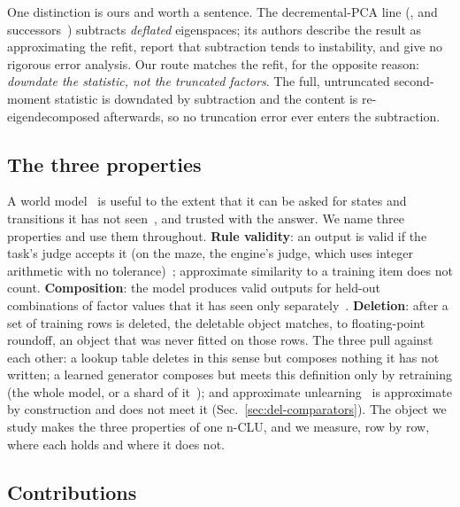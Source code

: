 \documentclass{article} %
\begin{document}
One distinction is ours and worth a sentence. The decremental-PCA line
(\citealp{hall_adding_2002}, and successors~\citep{jin_evd_2014,lee_fast_2021}) subtracts \emph{deflated} eigenspaces; its
authors describe the result as approximating the refit, report that subtraction tends to
instability, and give no rigorous error analysis. Our route matches the refit, for the opposite reason:
\emph{downdate the statistic, not the truncated factors}. The full, untruncated second-moment
statistic is downdated by subtraction and the content is re-eigendecomposed afterwards, so no
truncation error ever enters the subtraction.

\subsection{The three properties}
\label{sec:why}

A world model~\citep{ha_world_2018,hafner_mastering_2025} is useful to the extent that it can be asked for states and transitions it
has not seen~\citep{valevski_diffusion_2025}, and trusted with the answer. We name three properties and use them throughout.
\textbf{Rule validity}: an output is valid if the task's judge accepts it (on the maze, the engine's judge, which uses
integer arithmetic with no tolerance)~\citep{vafa_evaluating_2024}; approximate similarity to a training item does not count.
\textbf{Composition}: the model produces valid outputs for held-out combinations of factor
values that it has seen only separately~\citep{zhao_toward_2022}. \textbf{Deletion}: after a set of training rows
is deleted, the deletable object matches, to floating-point roundoff, an object that was never fitted
on those rows. The three pull against each other: a lookup table deletes in this sense but composes
nothing it has not written; a learned generator composes but meets this definition only by retraining
(the whole model, or a shard of it~\citep{bourtoule_machine_2021}); and
approximate unlearning~\citep{guo_certified_2023,golatkar_eternal_2020} is approximate by construction and does not meet it (Sec.~\ref{sec:del-comparators}).
The object we study makes the three properties of one n-CLU, and we measure, row by row, where each
holds and where it does not.

\subsection{Contributions}
\label{sec:contrib}
\end{document}
